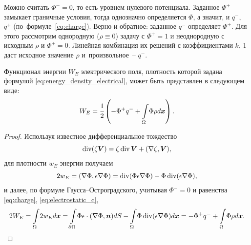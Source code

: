 Можно считать $\Phi^- = 0$, то есть уровнем нулевого потенциала. Заданное $\Phi^+$ замыкает граничные условия, тогда однозначно определяется $\Phi$, а значит, и $q^-$, $q^+$ (по~формуле~\eqref{eq:charge}). Верно и обратное: заданное $q^-$ определяет $\Phi^+$. Для этого рассмотрим однородную ($\rho \equiv 0$) задачу с $\Phi^+ = 1$ и неоднородную с исходным $\rho$ и $\Phi^+ = 0$. Линейная комбинация их решений с коэффициентами $k$, $1$ даст исходное значение $\rho$ и~произвольное~-- $q^-$.

\begin{proposition}
\label{prop:energy_electrical_form}
Функционал энергии $W_E$ электрического поля, плотность которой задана формулой \eqref{eq:energy_density_electrical}, может быть представлен в следующем виде:
\begin{equation}
    W_E = \cfrac{1}{2} \left( -\Phi^+ q^- + {\int\limits_\Omega} \Phi \rho d {\boldsymbol{x}} \right).
    \label{eq:energy_electrical_form}
\end{equation}
\end{proposition}
\begin{proof}
Используя известное дифференциальное тождество
\begin{equation}
    \operatorname{{div}}(\zeta \boldsymbol{V}) = \zeta \operatorname{{div}} \boldsymbol{V} + (\nabla \zeta, \boldsymbol{V}),
    \label{eq:identity_gradients_product}
\end{equation}
для плотности $w_E$ энергии получаем
\[
    2 w_E = (\nabla \Phi, \epsilon \nabla \Phi) = \operatorname{{div}}(\Phi \epsilon \nabla \Phi) - \Phi \operatorname{{div}}(\epsilon \nabla \Phi), 
\]
и далее, по формуле Гаусса--Остроградского, учитывая $\Phi^- = 0$ и равенства \eqref{eq:charge}, \eqref{eq:electrostatic_c},
\[
    2 W_E = {\int\limits_\Omega} 2 w_E d {\boldsymbol{x}} = {\int\limits_{\partial \Omega}} \Phi \epsilon \cdot (\nabla \Phi, {\boldsymbol{n}}) dS - {\int\limits_\Omega} \Phi \operatorname{{div}}(\epsilon \nabla \Phi) d {\boldsymbol{x}} = -\Phi^+ q^- + {\int\limits_\Omega} \Phi \rho d {\boldsymbol{x}}.
\]
\end{proof}

